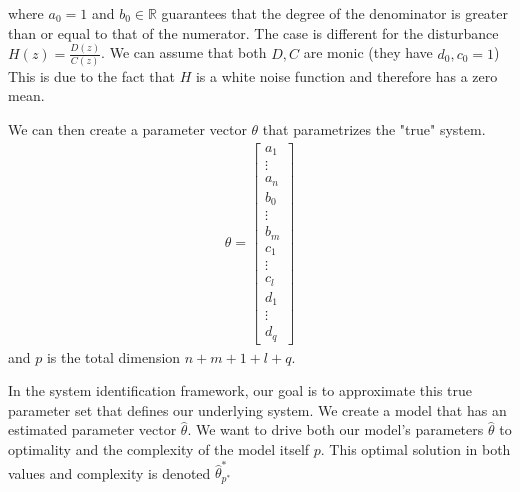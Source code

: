 \documentclass[11pt]{article}
\begin{document}
where $a_0 = 1$ and $b_0 \in \mathbb{R}$ guarantees that the degree of the denominator is greater than or equal to that of the numerator.
The case is different for the disturbance $H(z) = \frac{D(z)}{C(z)}$.
We can assume that both $D,C$ are monic (they have $d_0, c_0 = 1$)
This is due to the fact that $H$ is a white noise function and therefore has a zero mean.

We can then create a parameter vector $\theta$ that parametrizes the "true" system.
\begin{align}
  \theta = 
  \begin{bmatrix}
    a_1 \\ \vdots \\ a_n \\ b_0 \\ \vdots \\ b_m \\ c_1 \\ \vdots \\ c_l \\ d_1 \\ \vdots \\ d_q
  \end{bmatrix}
\end{align}
and $p$ is the total dimension $n+m+1+l+q$.

In the system identification framework, our goal is to approximate this true parameter set that defines our underlying system.
We create a model that has an estimated parameter vector $\hat{\theta}$.
We want to drive both our model's parameters $\hat{\theta}$ to optimality and the complexity of the model itself $p$.
This optimal solution in both values and complexity is denoted $\hat{\theta}_{p^*}^*$




\end{document}
